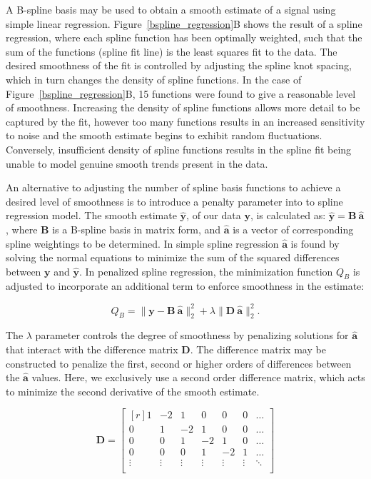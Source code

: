 \documentclass[num-refs]{wiley-article}
\begin{document}
A B-spline basis may be used to obtain a smooth estimate of a signal using simple linear regression. Figure~\ref{bspline_regression}B shows the result of a spline regression, where each spline function has been optimally weighted, such that the sum of the functions (spline fit line) is the least squares fit to the data. The desired smoothness of the fit is controlled by adjusting the spline knot spacing, which in turn changes the density of spline functions. In the case of Figure~\ref{bspline_regression}B, 15 functions were found to give a reasonable level of smoothness. Increasing the density of spline functions allows more detail to be captured by the fit, however too many functions results in an increased sensitivity to noise and the smooth estimate begins to exhibit random fluctuations. Conversely, insufficient density of spline functions results in the spline fit being unable to model genuine smooth trends present in the data.

An alternative to adjusting the number of spline basis functions to achieve a desired level of smoothness is to introduce a penalty parameter into to spline regression model. The smooth estimate $\hat{\mathbf{y}}$, of our data $\mathbf{y}$, is calculated as: $\hat{\mathbf{y}} = \mathbf{B} \ \hat{\mathbf{a}}$, where $\mathbf{B}$ is a B-spline basis in matrix form, and $\hat{\mathbf{a}}$ is a vector of corresponding spline weightings to be determined. In simple spline regression $\hat{\mathbf{a}}$ is found by solving the normal equations to minimize the sum of the squared differences between $\mathbf{y}$ and $\hat{\mathbf{y}}$. In penalized spline regression, the minimization function $Q_B$ is adjusted to incorporate an additional term to enforce smoothness in the estimate:

\begin{equation}
  Q_{B} = \|\mathbf{y} - \mathbf{B} \ \hat{\mathbf{a}} \|^{2}_{2} + \lambda \|\mathbf{D} \ \hat{\mathbf{a}}\|^{2}_{2}.
  \label{qb}
\end{equation}

The $\lambda$ parameter controls the degree of smoothness by penalizing solutions for $\hat{\mathbf{a}}$ that interact with the difference matrix $\mathbf{D}$. The difference matrix may be constructed to penalize the first, second or higher orders of differences between the $\hat{\mathbf{a}}$ values. Here, we exclusively use a second order difference matrix, which acts to minimize the second derivative of the smooth estimate.

\begin{equation}
  \mathbf{D} =
  \begin{bmatrix*}[r]
    1 & -2 &  1 &  0 &  0 &  0 & \dots \\
    0 &  1 & -2 &  1 &  0 &  0 & \dots \\
    0 &  0 &  1 & -2 &  1 &  0 & \dots \\
    0 &  0 &  0 &  1 & -2 &  1 & \dots \\
    \vdots & \vdots & \vdots & \vdots & \vdots & \vdots & \ddots \\
  \end{bmatrix*}
  \label{d_mat}
\end{equation}
\end{document}
